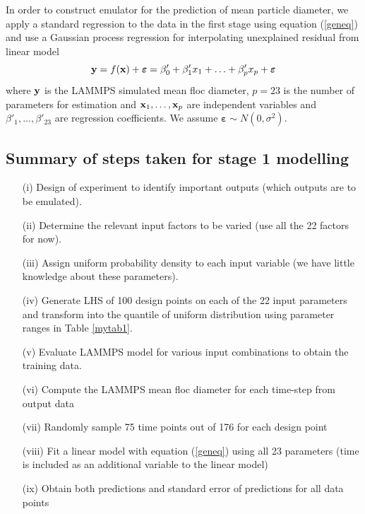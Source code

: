\documentclass[12pt,titlepage]{report}
\newcommand{\bx}{{\bf x}}
\newcommand{\by}{{\bf y}}
\theoremstyle{definition}
\theoremstyle{remark}
\begin{document}
In order to construct emulator for the prediction of mean particle diameter, we apply a standard regression to the data in the first stage using equation (\ref{geneq}) and use a Gaussian process regression for interpolating unexplained residual from linear model
\begin{equation}\label{geneq}
\by=f(\textbf{\bx})+\boldsymbol\varepsilon= \beta'_0+\beta'_{1}x_{1}+\ldots +\beta'_{p}x_{p}+\boldsymbol\varepsilon
\end{equation}
where $\by$ is the LAMMPS simulated mean floc diameter, $p=23$ is the number of parameters for estimation and $\bx_1,\ldots,\bx_p$ are independent variables and $\beta'_1,\ldots,\beta'_{23}$ are regression coefficients. We assume $\boldsymbol \varepsilon \sim N(0, \sigma^2)$. 

\subsection{Summary of steps taken for stage 1 modelling}
\begin{itemize}
\item[{(i)}] Design of experiment to identify important outputs (which outputs are to be emulated). 
\item[{(ii)}] Determine the relevant input factors to be varied (use all the 22 factors for now). 
\item[{(iii)}] Assign uniform probability density to each input variable (we have little knowledge about these parameters). 
\item[{(iv)}] Generate LHS of 100 design points on each of the 22 input parameters and transform into the quantile of uniform distribution using parameter ranges in Table \ref{mytab1}. 
\item[{(v)}] Evaluate LAMMPS model for various input combinations to obtain the training data.
\item[{(vi)}] Compute the LAMMPS mean floc diameter for each time-step from output data
\item[{(vii)}] Randomly sample 75 time points out of 176 for each design point
\item[{(viii)}] Fit a linear model with equation (\ref{geneq}) using all 23 parameters (time is included as an additional variable to the linear model)
\item[{(ix)}] Obtain both predictions and standard error of predictions for all data points
\end{itemize}
\end{document}
